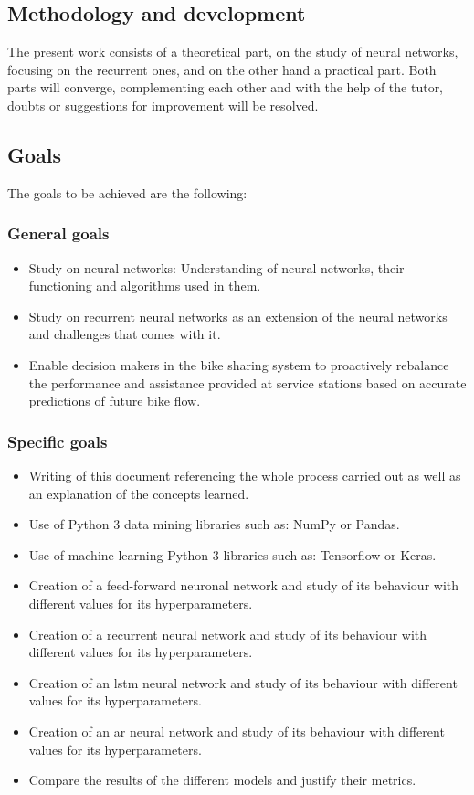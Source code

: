 \subsection{Methodology and development}
The present work consists of a theoretical part, on the study of neural networks, focusing on the recurrent ones, and on the other hand a practical part. Both parts will converge, complementing each other and with the help of the tutor, doubts or suggestions for improvement will be resolved.

\subsection{Goals}
The goals to be achieved are the following:

\subsubsection{General goals}
\begin{itemize}
    \item Study on neural networks: Understanding of neural networks, their functioning and algorithms used in them.
    \item Study on recurrent neural networks as an extension of the neural networks and challenges that comes with it.
    \item Enable decision makers in the bike sharing system to proactively rebalance the performance and assistance provided at service stations based on accurate predictions of future bike flow.
\end{itemize}

\subsubsection{Specific  goals}
\begin{itemize}
    \item Writing of this document referencing the whole process carried out as well as an explanation of the concepts learned.
    \item Use of Python 3 data mining libraries such as: NumPy or Pandas.
    \item Use of machine learning Python 3 libraries such as: Tensorflow or Keras.
    \item Creation of a feed-forward neuronal network and study of its behaviour with different values for its hyperparameters.
    \item Creation of a recurrent neural network and study of its behaviour with different values for its hyperparameters.
    \item Creation of an \acrshort{lstm} neural network and study of its behaviour with different values for its hyperparameters.
    \item Creation of an \acrshort{ar} neural network and study of its behaviour with different values for its hyperparameters.
    \item Compare the results of the different models and justify their metrics.
\end{itemize}